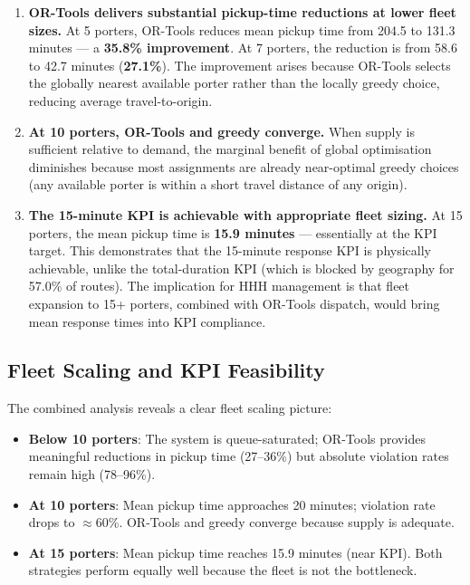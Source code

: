 \documentclass[12pt,a4paper]{article}
\begin{document}
\begin{enumerate}
  \item \textbf{OR-Tools delivers substantial pickup-time reductions at lower fleet sizes.} At 5 porters, OR-Tools reduces mean pickup time from 204.5 to 131.3 minutes --- a \textbf{35.8\% improvement}. At 7 porters, the reduction is from 58.6 to 42.7 minutes (\textbf{27.1\%}). The improvement arises because OR-Tools selects the globally nearest available porter rather than the locally greedy choice, reducing average travel-to-origin.

  \item \textbf{At 10 porters, OR-Tools and greedy converge.} When supply is sufficient relative to demand, the marginal benefit of global optimisation diminishes because most assignments are already near-optimal greedy choices (any available porter is within a short travel distance of any origin).

  \item \textbf{The 15-minute KPI is achievable with appropriate fleet sizing.} At 15 porters, the mean pickup time is \textbf{15.9 minutes} --- essentially at the KPI target. This demonstrates that the 15-minute response KPI is physically achievable, unlike the total-duration KPI (which is blocked by geography for 57.0\% of routes). The implication for HHH management is that fleet expansion to 15+ porters, combined with OR-Tools dispatch, would bring mean response times into KPI compliance.
\end{enumerate}

\subsection{Fleet Scaling and KPI Feasibility}

The combined analysis reveals a clear fleet scaling picture:

\begin{itemize}
  \item \textbf{Below 10 porters}: The system is queue-saturated; OR-Tools provides meaningful reductions in pickup time (27--36\%) but absolute violation rates remain high (78--96\%).
  \item \textbf{At 10 porters}: Mean pickup time approaches 20 minutes; violation rate drops to $\approx$60\%. OR-Tools and greedy converge because supply is adequate.
  \item \textbf{At 15 porters}: Mean pickup time reaches 15.9 minutes (near KPI). Both strategies perform equally well because the fleet is not the bottleneck.
\end{itemize}
\end{document}

